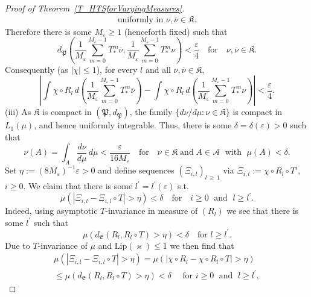 \documentclass[10pt]{amsart}
\theoremstyle{definition}\newtheorem{defi}[theo]{Definition}\newtheorem{rema}[theo]{Remark}\newtheorem{exam}[theo]{Example}\newtheorem{exem}[theo]{Example}\newtheorem{nota}[theo]{Notation}
\newcommand{\clA}{\mathcal{A}}
\newcommand{\Lip}{\mathrm{Lip}}
\newcommand{\frkK}{\mathfrak{K}}
\newcommand{\frkP}{\mathfrak{P}}
\newcommand{\frkE}{\mathfrak{E}}
\begin{document}
\begin{proof}[{Proof of Theorem~\ref{T_HTSforVaryingMeasures}}]
\[\begin{aligned}
\text{uniformly in }\nu,\overline{\nu}\in\frkK.
\end{aligned}
\]
Therefore there is some $M_{\varepsilon}\geq1$ (henceforth fixed) such that
\[
d_{\frkP}\left(\frac{1}{M_{\varepsilon}}\sum_{m=0}^{M_{\varepsilon }-1}T_{\ast}^{m}\overline{\nu},\frac{1}{M_{\varepsilon}}\sum_{m=0} ^{M_{\varepsilon}-1}T_{\ast}^{m}\nu\right) <\frac{\varepsilon}{4} \quad\text{for}\quad\nu,\overline{\nu}\in\frkK.
\]
Consequently (as $\left\vert \chi\right\vert \leq1$), for every $l$ and all $\nu,\overline{\nu}\in\frkK$,
\begin{equation}
\left\vert \int\chi\circ R_{l}\,d\left(\frac{1}{M_{\varepsilon}}\sum _{m=0}^{M_{\varepsilon}-1}T_{\ast}^{m}\overline{\nu}\right) -\int\chi\circ R_{l}\,d\left(\frac{1}{M_{\varepsilon}}\sum_{m=0}^{M_{\varepsilon}-1} T_{\ast}^{m}\nu\right) \right\vert <\frac{\varepsilon}{4}.\label{Eq_TheSmearedComparison}
\end{equation}
(iii) \label{prf.theo6.3.3} As $\frkK$ is compact in $(\frkP,d_{\frkP })$, the family $\{d\nu/d\mu:\nu\in\frkK\}$ is compact in $L_{1}(\mu)$, and hence uniformly integrable. Thus, there is some $\delta=\delta (\varepsilon)>0$ such that
\begin{equation}\label{Eq_HuHu}
\nu(A)=\int_{A}\frac{d\nu}{d\mu}\,d\mu<\frac{\varepsilon}{16M_{\varepsilon} }\quad\text{for}\quad \nu\in\frkK\;\text{and}\;A\in\clA\; \text{ with }\;\mu(A)<\delta.
\end{equation}
Set $\eta:=(8M_{\varepsilon})^{-1}\varepsilon>0$ and define sequences $(\Xi_{i,l})_{l\,\geq\,1}$ via $\Xi_{i,l}:=\chi\circ R_{l}\circ T^{i}$, $i\geq0$. We claim that there is some $l^{\prime}=l^{\prime}(\varepsilon)$ s.t.
\begin{equation}\label{Eq_DefiningLPrime}
\mu\left(\left\vert \Xi_{i,l}-\Xi_{i,l}\circ T\right\vert >\eta\right) <\delta\quad \text{for}\quad i\geq0\;\text{ and }\;l\geq l^{\prime}.
\end{equation}
Indeed, using asymptotic $T$-invariance in measure of $(R_{l})$ we see that there is some $l^{\prime}$ such that
\[
\mu\left(d_{\frkE}(R_{l},R_{l}\circ T)>\eta\right) <\delta
\quad \text{for }l\geq l^{\prime}.
\]
Due to $T$-invariance of $\mu$ and $\Lip(\varkappa)\leq1$ we then find that
\begin{multline*}
\mu\left(\left\vert \Xi_{i,l}-\Xi_{i,l}\circ T\right\vert >\eta\right)
 =\mu\left(\left\vert \chi\circ R_{l}-\chi\circ R_{l}\circ T\right\vert >\eta\right)\\
 \leq\mu\left(d_{\frkE}(R_{l},R_{l}\circ T)>\eta\right) 
 <\delta\quad \text{ for }i\geq0\;\text{ and }\;l\geq l^{\prime},

\end{multline*}
\end{proof}
\end{document}
